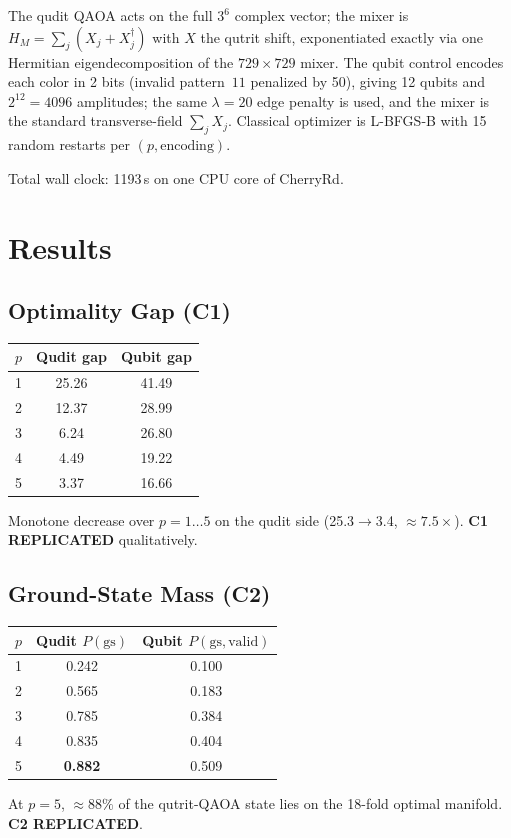 \documentclass[11pt]{article}
\begin{document}
The qudit QAOA acts on the full $3^6$ complex vector; the mixer is
$H_M=\sum_j(X_j+X_j^\dagger)$ with $X$ the qutrit shift, exponentiated
exactly via one Hermitian eigendecomposition of the $729\times729$ mixer.
The qubit control encodes each color in 2 bits (invalid pattern~$11$
penalized by 50), giving 12 qubits and $2^{12}=4096$ amplitudes; the
same $\lambda=20$ edge penalty is used, and the mixer is the standard
transverse-field $\sum_j X_j$. Classical optimizer is L-BFGS-B with
15 random restarts per $(p,\text{encoding})$.

Total wall clock: 1193\,s on one CPU core of CherryRd.

\section{Results}

\subsection{Optimality Gap (C1)}
\begin{center}
\begin{tabular}{c cc}
\toprule
$p$ & Qudit gap & Qubit gap \\
\midrule
1 & 25.26 & 41.49 \\
2 & 12.37 & 28.99 \\
3 &  6.24 & 26.80 \\
4 &  4.49 & 19.22 \\
5 &  3.37 & 16.66 \\
\bottomrule
\end{tabular}
\end{center}
Monotone decrease over $p=1\dots5$ on the qudit side (25.3$\to$3.4,
$\approx 7.5\times$). \textbf{C1 REPLICATED} qualitatively.

\subsection{Ground-State Mass (C2)}
\begin{center}
\begin{tabular}{c cc}
\toprule
$p$ & Qudit $P(\mathrm{gs})$ & Qubit $P(\mathrm{gs, valid})$\\
\midrule
1 & 0.242 & 0.100 \\
2 & 0.565 & 0.183 \\
3 & 0.785 & 0.384 \\
4 & 0.835 & 0.404 \\
5 & \textbf{0.882} & 0.509 \\
\bottomrule
\end{tabular}
\end{center}
At $p=5$, $\approx88\%$ of the qutrit-QAOA state lies on the 18-fold
optimal manifold. \textbf{C2 REPLICATED}.
\end{document}
